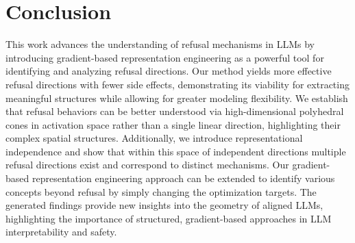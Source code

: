 \section{Conclusion}
This work advances the understanding of refusal mechanisms in LLMs by introducing gradient-based representation engineering as a powerful tool for identifying and analyzing refusal directions. Our method yields more effective refusal directions with fewer side effects, demonstrating its viability for extracting meaningful structures while allowing for greater modeling flexibility.
We establish that refusal behaviors can be better understood via high-dimensional polyhedral cones in activation space rather than a single linear direction, highlighting their complex spatial structures. Additionally, we introduce representational independence and show that within this space of independent directions multiple refusal directions exist and correspond to distinct mechanisms.
Our gradient-based representation engineering approach can be extended to identify various concepts beyond refusal by simply changing the optimization targets.
The generated findings provide new insights into the geometry of aligned LLMs, highlighting the importance of structured, gradient-based approaches in LLM interpretability and safety. %
